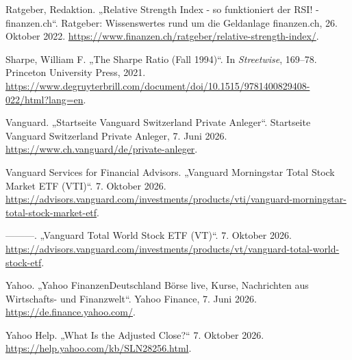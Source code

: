\documentclass[
  ngerman,
  a4paper,
  DIV=11,
  oneside]{scrreprt}
\newlength{\cslhangindent}
\newenvironment{CSLReferences}[2] %
 {\begin{list}{}{%
  \setlength{\itemindent}{0pt}
  \setlength{\leftmargin}{0pt}
  \setlength{\parsep}{0pt}
  \ifodd #1
   \setlength{\leftmargin}{\cslhangindent}
   \setlength{\itemindent}{-1\cslhangindent}
  \fi
  \setlength{\itemsep}{#2\baselineskip}}}
 {\end{list}}
\begin{document}
\begin{CSLReferences}{1}{1}
Ratgeber, Redaktion. {„Relative Strength Index - so funktioniert der
RSI! - finanzen.ch``}. Ratgeber: Wissenswertes rund um die Geldanlage
\textbar{} finanzen.ch, 26. Oktober 2022.
\url{https://www.finanzen.ch/ratgeber/relative-strength-index/}.

Sharpe, William F. {„The {Sharpe Ratio} ({Fall} 1994)``}. In
\emph{Streetwise}, 169--78. Princeton University Press, 2021.
\url{https://www.degruyterbrill.com/document/doi/10.1515/9781400829408-022/html?lang=en}.

Vanguard. {„Startseite \textbar{} Vanguard Switzerland Private
Anleger``}. Startseite \textbar{} Vanguard Switzerland Private Anleger,
7. Juni 2026. \url{https://www.ch.vanguard/de/private-anleger}.

Vanguard Services for Financial Advisors. {„Vanguard {Morningstar Total
Stock Market ETF} ({VTI})``}. 7. Oktober 2026.
\url{https://advisors.vanguard.com/investments/products/vti/vanguard-morningstar-total-stock-market-etf}.

---------. {„Vanguard {Total World Stock ETF} ({VT})``}. 7. Oktober
2026.
\url{https://advisors.vanguard.com/investments/products/vt/vanguard-total-world-stock-etf}.

Yahoo. {„Yahoo FinanzenDeutschland \textbar{} Börse live, Kurse,
Nachrichten aus Wirtschafts- und Finanzwelt``}. Yahoo Finance, 7. Juni
2026. \url{https://de.finance.yahoo.com/}.

Yahoo Help. {„What Is the Adjusted Close?``} 7. Oktober 2026.
\url{https://help.yahoo.com/kb/SLN28256.html}.

\end{CSLReferences}
\end{document}
